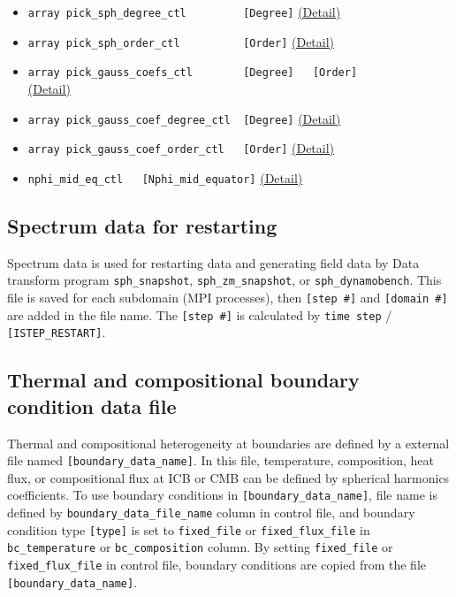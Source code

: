 \begin{itemize}
\begin{itemize}
	\item \verb|array pick_sph_degree_ctl         [Degree]|
    		\hyperref[href_t:pick_sph_degree_ctl]{(Detail)}
	\item \verb|array pick_sph_order_ctl          [Order]|
    		\hyperref[href_t:pick_sph_order_ctl]{(Detail)}
	\item \verb|array pick_gauss_coefs_ctl        [Degree]   [Order]| \\
    		\hyperref[href_t:pick_gauss_coefs_ctl]{(Detail)}
	\item \verb|array pick_gauss_coef_degree_ctl  [Degree]|
    		\hyperref[href_t:pick_gauss_coef_degree_ctl]{(Detail)}
	\item \verb|array pick_gauss_coef_order_ctl   [Order]|
    		\hyperref[href_t:pick_gauss_coef_order_ctl]{(Detail)}
%
	\item \verb|nphi_mid_eq_ctl   [Nphi_mid_equator]|
		\label{href_i:nphi_mid_eq_ctl}
    		\hyperref[href_t:nphi_mid_eq_ctl]{(Detail)}
%
	\end{itemize}
\end{itemize}
%
\subsection{Spectrum data for restarting}
Spectrum data is used for restarting data and generating field data by Data transform program \verb|sph_snapshot|, \verb|sph_zm_snapshot|, or \verb|sph_dynamobench|. This file is saved for each subdomain (MPI processes), then \verb|[step #]| and \verb|[domain #]| are added in the file name. The \verb|[step #]| is calculated by \verb|time step| / \verb|[ISTEP_RESTART]|.

\subsection{Thermal and compositional boundary condition data file}\label{sec:boundary_file}
Thermal and compositional heterogeneity at boundaries are defined by a external file named  \verb|[boundary_data_name]|. In this file, temperature, composition, heat flux, or compositional flux at ICB or CMB can be defined by spherical harmonics coefficients. To use boundary conditions in \verb|[boundary_data_name]|, file name is defined by \verb|boundary_data_file_name| column in control file, and boundary condition type \verb|[type]| is set to \verb|fixed_file| or \verb|fixed_flux_file| in \verb|bc_temperature| or \verb|bc_composition| column. By setting \verb|fixed_file| or \verb|fixed_flux_file| in control file, boundary conditions are copied from the file \verb|[boundary_data_name]|.

